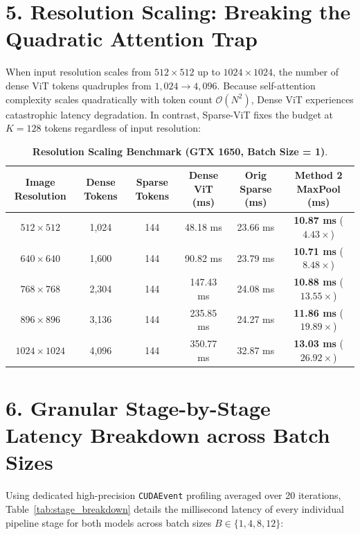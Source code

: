 \documentclass[11pt,a4paper]{article}
\begin{document}
\vspace{0.4em}

\section*{5. Resolution Scaling: Breaking the Quadratic Attention Trap}

When input resolution scales from $512\times 512$ up to $1024\times 1024$, the number of dense ViT tokens quadruples from $1,024 \rightarrow 4,096$. Because self-attention complexity scales quadratically with token count $\mathcal{O}(N^2)$, Dense ViT experiences catastrophic latency degradation. In contrast, Sparse-ViT fixes the budget at $K=128$ tokens regardless of input resolution:

\begin{table}[H]
\centering
\small
\renewcommand{\arraystretch}{1.2}
\setlength{\tabcolsep}{8pt}
\begin{tabular}{cccccc}
\toprule
\textbf{Image Resolution} & \textbf{Dense Tokens} & \textbf{Sparse Tokens} & \textbf{Dense ViT (ms)} & \textbf{Orig Sparse (ms)} & \textbf{Method 2 MaxPool (ms)} \\
\midrule
$512 \times 512$   & 1,024 & 144 &  48.18 ms & 23.66 ms & \textbf{10.87 ms} ($\mathbf{4.43\times}$) \\
$640 \times 640$   & 1,600 & 144 &  90.82 ms & 23.79 ms & \textbf{10.71 ms} ($\mathbf{8.48\times}$) \\
$768 \times 768$   & 2,304 & 144 & 147.43 ms & 24.08 ms & \textbf{10.88 ms} ($\mathbf{13.55\times}$) \\
$896 \times 896$   & 3,136 & 144 & 235.85 ms & 24.27 ms & \textbf{11.86 ms} ($\mathbf{19.89\times}$) \\
$1024 \times 1024$ & 4,096 & 144 & 350.77 ms & 32.87 ms & \textbf{13.03 ms} ($\mathbf{26.92\times}$) \\
\bottomrule
\end{tabular}
\caption{\textbf{Resolution Scaling Benchmark (GTX 1650, Batch Size = 1)}.}
\label{tab:resolution_scaling}
\end{table}

\vspace{0.4em}

\section*{6. Granular Stage-by-Stage Latency Breakdown across Batch Sizes}

Using dedicated high-precision \texttt{CUDAEvent} profiling averaged over 20 iterations, Table~\ref{tab:stage_breakdown} details the millisecond latency of every individual pipeline stage for both models across batch sizes $B \in \{1, 4, 8, 12\}$:
\end{document}
